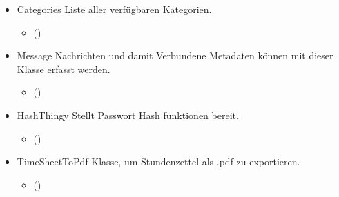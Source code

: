 \begin{itemize}
            \item{Categories}
                Liste aller verfügbaren Kategorien.
                \begin{itemize}
                    \item()
                \end{itemize}

            \item{Message}
                Nachrichten und damit Verbundene Metadaten können mit dieser Klasse erfasst werden.
                \begin{itemize}
                    \item()
                \end{itemize}

            \item{HashThingy}
                Stellt Passwort Hash funktionen bereit.
                \begin{itemize}
                    \item()
                \end{itemize}

            \item{TimeSheetToPdf}
                Klasse, um Stundenzettel als .pdf zu exportieren.
                \begin{itemize}
                    \item()
                \end{itemize}

        \end{itemize}

